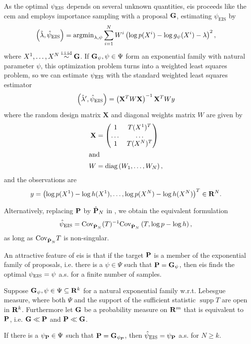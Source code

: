 As the optimal $\peis$ depends on several unknown quantities, \gls{eis} proceeds like the \gls{cem} and employs importance sampling with a proposal $\G$, estimating $\psi_{\text{EIS}}$ by
$$
\left(\hat \lambda,\hat \psi_{\text{EIS}}\right) = \argmin_{\lambda,\psi} \sum_{i=1}^N W^{i} \left( \log p(X^{i}) - \log g_{\psi}(X^{i}) - \lambda \right)^{2},
$$
where $X^{1}, \dots, X^{N} \iid \G$. 
If $\G_{\psi}, \psi \in \Psi$ form an exponential family with natural parameter $\psi$, this optimization problem turns into a weighted least squares problem, so we can estimate $\peis$ with the standard weighted least squares estimator
$$
\left( \hat\lambda', \hpeis \right) = \left(\mathbf X^{T}W\mathbf X\right)^{-1}\mathbf X^{T}W y%
$$
where the random design matrix $\mathbf X$ and diagonal weights matrix $W$ are given by
\begin{align*}
\mathbf X &= \begin{pmatrix}
    1 & T(X^{1})^{T} \\
    \dots&\dots\\
    1 & T(X^{N})^{T} \\
\end{pmatrix}\\
\intertext{and}
W &= \text{diag} \left( W_{1}, \dots, W_{N} \right),
\end{align*}
and the observations are 
\begin{align*}
y = \left( \log p(X^{1}) - \log h(X^{1}), \dots, \log p(X^{N}) - \log h(X^{N}) \right)^{T} \in \R^{N}.
\end{align*}

Alternatively, replacing $\P$ by $\hat\P_{N}$ in , we obtain the equivalent formulation
\begin{align}
    \label{eq:hpeis-cov}
    \hpeis = \cov_{\hat\P_{N}} (T)^{-1} \cov_{\hat \P_{N}} \left( T, \log p - \log h \right),
\end{align}
as long as $\cov_{\hat \P_{N}} T$ is non-singular.

An attractive feature of \gls{eis} is that if the target $\P$ is a member of the exponential family of proposals, i.e. there is a $\psi\in\Psi$ such that $\P = \G_{\psi}$, then \gls{eis} finds the optimal $\peis = \psi$ a.s. for a finite number of samples.

\begin{proposition}
    Suppose $\G_{\psi}, \psi \in \Psi \subseteq \R^{k}$ for a natural exponential family w.r.t. Lebesgue measure, where both $\Psi$ and the support of the sufficient statistic $\operatorname{supp} T$ are open in $\R^{k}$. 
    Furthermore let $\G$ be a probability measure on $\R^{m}$ that is equivalent to $\P$, i.e. $\G \ll \P$ and $\P \ll \G$. 

    If there is a $\psi_{\P} \in \Psi$ such that $\P = \G_{\psi_{\P}}$, then $\hpeis = \psi_{\P}$ a.s. for $N \geq k$. 
\end{proposition}

